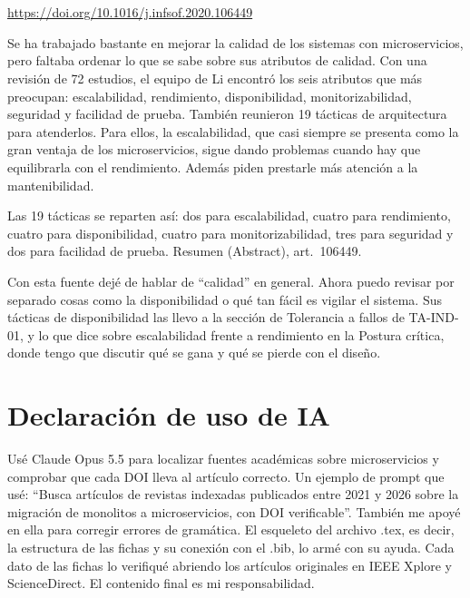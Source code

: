\documentclass[11pt,a4paper]{article}
\newcommand{\ficha}[6]{%
  \section{\texorpdfstring{\citefield{#2}{title}}{#1}}
  \begin{description}[style=nextline,leftmargin=0pt,itemsep=6pt]
    \item[Referencia (IEEE)] \cite{#2}
    \item[DOI verificado] \href{https://doi.org/#3}{https://doi.org/#3}
    \item[Resumen] #4
    \item[Dato concreto] #5
    \item[Nota personal] #6
  \end{description}
}
\begin{document}
\ficha{Li et al. (2021)}{li2021}{10.1016/j.infsof.2020.106449}
{Se ha trabajado bastante en mejorar la calidad de los sistemas con microservicios, pero faltaba ordenar lo que se sabe sobre sus atributos de calidad. Con una revisión de 72 estudios, el equipo de Li encontró los seis atributos que más preocupan: escalabilidad, rendimiento, disponibilidad, monitorizabilidad, seguridad y facilidad de prueba. También reunieron 19 tácticas de arquitectura para atenderlos. Para ellos, la escalabilidad, que casi siempre se presenta como la gran ventaja de los microservicios, sigue dando problemas cuando hay que equilibrarla con el rendimiento. Además piden prestarle más atención a la mantenibilidad.}
{Las 19 tácticas se reparten así: dos para escalabilidad, cuatro para rendimiento, cuatro para disponibilidad, cuatro para monitorizabilidad, tres para seguridad y dos para facilidad de prueba. Resumen (Abstract), art.~106449.}
{Con esta fuente dejé de hablar de \enquote{calidad} en general. Ahora puedo revisar por separado cosas como la disponibilidad o qué tan fácil es vigilar el sistema. Sus tácticas de disponibilidad las llevo a la sección de Tolerancia a fallos de TA-IND-01, y lo que dice sobre escalabilidad frente a rendimiento en la Postura crítica, donde tengo que discutir qué se gana y qué se pierde con el diseño.}

\section*{Declaración de uso de IA}
Usé Claude Opus 5.5 para localizar fuentes académicas sobre microservicios y comprobar que cada DOI lleva al artículo correcto. Un ejemplo de prompt que usé: \enquote{Busca artículos de revistas indexadas publicados entre 2021 y 2026 sobre la migración de monolitos a microservicios, con DOI verificable}. También me apoyé en ella para corregir errores de gramática. El esqueleto del archivo .tex, es decir, la estructura de las fichas y su conexión con el .bib, lo armé con su ayuda. Cada dato de las fichas lo verifiqué abriendo los artículos originales en IEEE Xplore y ScienceDirect. El contenido final es mi responsabilidad.

\printbibliography[title={Referencias}]
\end{document}
